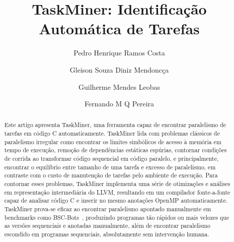 \documentclass[sigplan,10pt,review]{acmart}
\newcommand\Taskminer{\mbox{\textsf{TaskMiner}}}
\begin{document}
\title[Automatic Identification and Annotation of Tasks in Structured
Programs]
{TaskMiner: Identificação Automática de Tarefas}

\author{Pedro Henrique Ramos Costa}

\author{Gleison Souza Diniz Mendonc\c{c}a}

\author{Guilherme Mendes Leobas}

\author{Fernando M Q Pereira}

\begin{abstract}
Este artigo apresenta \Taskminer{}, uma ferramenta capaz de encontrar paralelismo de tarefas
em código C automaticamente. \Taskminer{} lida com problemas clássicos de paralelismo irregular como
encontrar os limites simbólicos de acesso à memória em tempo de execução, remoção de dependências
estáticas espúrias, contornar condições de corrida ao transformar código sequencial em código paralelo, e
principalmente, encontrar o equilíbrio entre tamanho de uma tarefa e excesso de paralelismo, em contraste com
o custo de manutenção de tarefas pelo ambiente de execução. Para contornar esses problemas,
\Taskminer{} implementa uma série de otimizações e análises em representação intermediária do LLVM, resultando
em um compilador fonte-a-fonte capaz de analisar código C e inserir no mesmo anotações OpenMP automaticamente. \Taskminer{} prova-se eficaz ao encontrar paralelismo apontado manualmente em benchmarks como \textsf{BSC-Bots}~\cite{Duran09}, produzindo programas tão rápidos ou mais velozes que as versões sequenciais e anotadas manualmente, além de encontrar paralelismo escondido em programas sequenciais, absolutamente sem intervenção humana.
\end{abstract}
\end{document}
